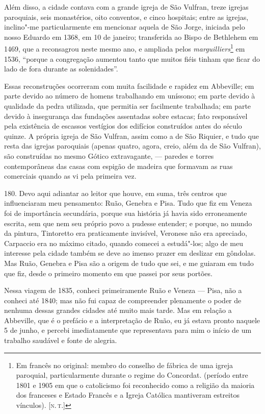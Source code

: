 Além disso, a cidade contava com a grande igreja de São Vulfran, treze
igrejas paroquiais, seis monastérios, oito conventos, e cinco hospitais;
entre as igrejas, inclino"-me particularmente em mencionar aquela de São
Jorge, iniciada pelo nosso Eduardo em 1368, em 10 de janeiro;
transferida ao Bispo de Bethlehem em 1469, que a reconsagrou neste mesmo
ano, e ampliada pelos \emph{marguilliers}\footnote{Em francês no
  original: membro do conselho de fábrica de uma igreja paroquial,
  particularmente durante o regime do Concordat. (período entre 1801 e
  1905 em que o catolicismo foi reconhecido como a religião da maioria
  dos franceses e Estado Francês e a Igreja Católica mantiveram
  estreitos vínculos). {[}\textsc{n.\,t.}{]}} em 1536, ``porque a congregação
aumentou tanto que muitos fiéis tinham que ficar do lado de fora durante
as solenidades''.

Essas reconstruções ocorreram com muita facilidade e rapidez em
Abbeville; em parte devido ao número de homens trabalhando em uníssono;
em parte devido à qualidade da pedra utilizada, que permitia ser
facilmente trabalhada; em parte devido à insegurança das fundações
assentadas sobre estacas; fato responsável pela existência de escassos
vestígios dos edifícios construídos antes do século quinze. A própria
igreja de São Vulfran, assim como a de São Riquier, e tudo que resta das
igrejas paroquiais (apenas quatro, agora, creio, além da de São
Vulfran), são construídas no mesmo Gótico extravagante, --- paredes e
torres contemporâneas das casas com espigão de madeira que formavam as
ruas comerciais quando as vi pela primeira vez.

180. Devo aqui adiantar ao leitor que houve, em suma, três centros que
influenciaram meu pensamento: Ruão, Genebra e Pisa. Tudo que fiz em
Veneza foi de importância secundária, porque sua história já havia sido
erroneamente escrita, sem que nem seu próprio povo a pudesse entender; e
porque, no mundo da pintura, Tintoretto era praticamente invisível,
Veronese não era apreciado, Carpaccio era no máximo citado, quando
comecei a estudá"-los; algo de meu interesse pela cidade também se deve
ao imenso prazer em deslizar em gôndolas. Mas Ruão, Genebra e Pisa são a
origem de tudo que sei, e me guiaram em tudo que fiz, desde o primeiro
momento em que passei por seus portões.

Nessa viagem de 1835, conheci primeiramente Ruão e Veneza --- Pisa, não a
conheci até 1840; mas não fui capaz de compreender plenamente o poder de
nenhuma dessas grandes cidades até muito mais tarde. Mas em relação a
Abbeville, que é o prefácio e a interpretação de Ruão, eu já estava
pronto naquele 5 de junho, e percebi imediatamente que representava para
mim o início de um trabalho saudável e fonte de alegria.

